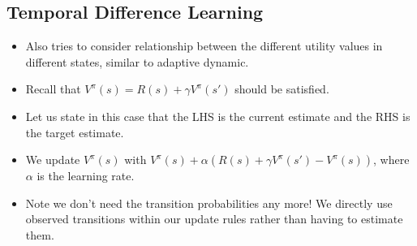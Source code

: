 \documentclass{article}
\begin{document}
\subsection{Temporal Difference Learning}
\begin{itemize}
    \item Also tries to consider relationship between the different utility values in different states, similar to adaptive dynamic.
    \item Recall that $V^\pi(s) = R(s) + \gamma V^\pi(s')$ should be satisfied.
    \item Let us state in this case that the LHS is the current estimate and the RHS is the target estimate.
    \item We update $V^\pi(s)$ with $V^\pi(s) + \alpha(R(s) + \gamma V^\pi(s') - V^\pi(s))$, where $\alpha$ is the learning rate.
    \item Note we don't need the transition probabilities any more!  We directly use observed transitions within our update rules rather than having to estimate them.
\end{itemize}
\end{document}
